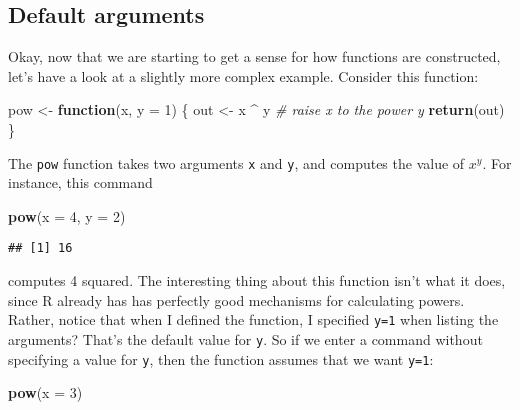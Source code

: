 \documentclass[]{book}
\newenvironment{Shaded}{\begin{snugshade}}{\end{snugshade}}
\newcommand{\CommentTok}[1]{\textcolor[rgb]{0.56,0.35,0.01}{\textit{#1}}}
\newcommand{\ControlFlowTok}[1]{\textcolor[rgb]{0.13,0.29,0.53}{\textbf{#1}}}
\newcommand{\DataTypeTok}[1]{\textcolor[rgb]{0.13,0.29,0.53}{#1}}
\newcommand{\DecValTok}[1]{\textcolor[rgb]{0.00,0.00,0.81}{#1}}
\newcommand{\KeywordTok}[1]{\textcolor[rgb]{0.13,0.29,0.53}{\textbf{#1}}}
\newcommand{\NormalTok}[1]{#1}
\newcommand{\OperatorTok}[1]{\textcolor[rgb]{0.81,0.36,0.00}{\textbf{#1}}}
\newcommand{\StringTok}[1]{\textcolor[rgb]{0.31,0.60,0.02}{#1}}
\begin{document}
\hypertarget{default-arguments}{%
\subsection{Default arguments}\label{default-arguments}}

Okay, now that we are starting to get a sense for how functions are constructed, let's have a look at a slightly more complex example. Consider this function:

\begin{Shaded}
\begin{Highlighting}[]
\NormalTok{pow <-}\StringTok{ }\ControlFlowTok{function}\NormalTok{(x, }\DataTypeTok{y =} \DecValTok{1}\NormalTok{) \{ }
\NormalTok{  out <-}\StringTok{ }\NormalTok{x }\OperatorTok{^}\StringTok{ }\NormalTok{y  }\CommentTok{# raise x to the power y }
  \KeywordTok{return}\NormalTok{(out)}
\NormalTok{\}}
\end{Highlighting}
\end{Shaded}

The \texttt{pow} function takes two arguments \texttt{x} and \texttt{y}, and computes the value of \(x^y\). For instance, this command

\begin{Shaded}
\begin{Highlighting}[]
\KeywordTok{pow}\NormalTok{(}\DataTypeTok{x =} \DecValTok{4}\NormalTok{, }\DataTypeTok{y =} \DecValTok{2}\NormalTok{)}
\end{Highlighting}
\end{Shaded}

\begin{verbatim}
## [1] 16
\end{verbatim}

computes 4 squared. The interesting thing about this function isn't what it does, since R already has has perfectly good mechanisms for calculating powers. Rather, notice that when I defined the function, I specified \texttt{y=1} when listing the arguments? That's the default value for \texttt{y}. So if we enter a command without specifying a value for \texttt{y}, then the function assumes that we want \texttt{y=1}:

\begin{Shaded}
\begin{Highlighting}[]
\KeywordTok{pow}\NormalTok{(}\DataTypeTok{x =} \DecValTok{3}\NormalTok{)}
\end{Highlighting}
\end{Shaded}
\end{document}
